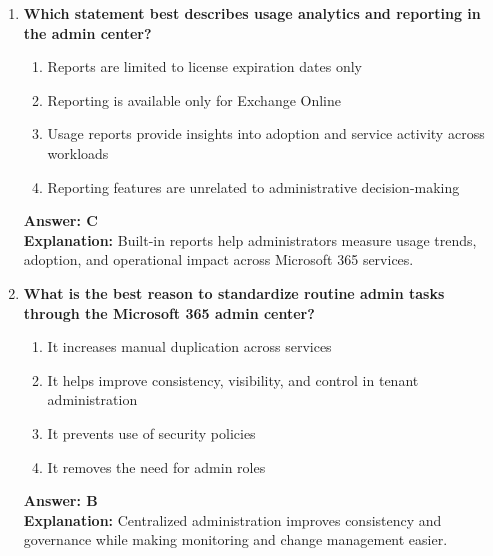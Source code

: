 \documentclass[10pt]{article}
\begin{document}
\begin{enumerate}[leftmargin=*]
\item \textbf{Which statement best describes usage analytics and reporting in the admin center?}
\begin{enumerate}[label=\Alph*.]
  \item Reports are limited to license expiration dates only
  \item Reporting is available only for Exchange Online
  \item Usage reports provide insights into adoption and service activity across workloads
  \item Reporting features are unrelated to administrative decision-making
\end{enumerate}
\textbf{Answer: C}\\
\textbf{Explanation:} Built-in reports help administrators measure usage trends, adoption, and operational impact across Microsoft 365 services.

\item \textbf{What is the best reason to standardize routine admin tasks through the Microsoft 365 admin center?}
\begin{enumerate}[label=\Alph*.]
  \item It increases manual duplication across services
  \item It helps improve consistency, visibility, and control in tenant administration
  \item It prevents use of security policies
  \item It removes the need for admin roles
\end{enumerate}
\textbf{Answer: B}\\
\textbf{Explanation:} Centralized administration improves consistency and governance while making monitoring and change management easier.

\end{enumerate}
\clearpage
\end{document}
